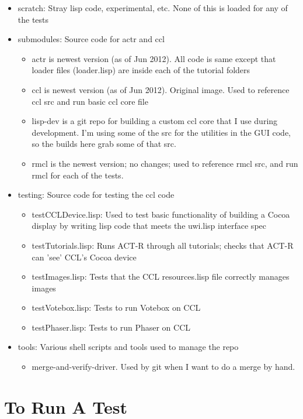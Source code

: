 \documentclass[12pt]{article} %
\begin{document}
\begin{itemize}
\item scratch: Stray lisp code, experimental, etc. None of this is loaded for any of the tests

\item submodules: Source code for actr and ccl
	\begin{itemize}
	\item actr is newest version (as of Jun 2012). All code is same except that loader files (loader.lisp) are inside each of the tutorial folders
	\item ccl is newest version (as of Jun 2012). Original image. Used to reference ccl src and run basic ccl core file
	\item lisp-dev is a git repo for building a custom ccl core that I use during development. I'm using some of the src for the utilities in the GUI code, so the builds here grab some of that src.
	\item rmcl is the newest version; no changes; used to reference rmcl src, and run rmcl for each of the tests.
	\end{itemize}

\item testing: Source code for testing the ccl code
	\begin{itemize}
	\item testCCLDevice.lisp: Used to test basic functionality of building a Cocoa display by writing lisp code that meets the uwi.lisp interface spec
	\item testTutorials.lisp: Runs ACT-R through all tutorials; checks that ACT-R can 'see' CCL's Cocoa device
	\item testImages.lisp: Tests that the CCL resources.lisp file correctly manages images
	\item testVotebox.lisp: Tests to run Votebox on CCL
	\item testPhaser.lisp: Tests to run Phaser on CCL
	\end{itemize}

\item tools: Various shell scripts and tools used to manage the repo
	\begin{itemize}
	\item merge-and-verify-driver. Used by git when I want to do a merge by hand.
	\end{itemize}

\end{itemize}

\section{To Run A Test}
\end{document}

